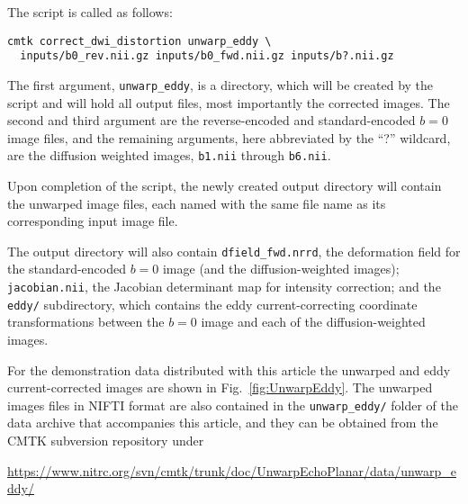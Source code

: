 \documentclass{InsightArticle}
\begin{document}
The script is called as follows:
\begin{verbatim}
cmtk correct_dwi_distortion unwarp_eddy \
  inputs/b0_rev.nii.gz inputs/b0_fwd.nii.gz inputs/b?.nii.gz
\end{verbatim}
The first argument, \verb|unwarp_eddy|, is a directory, which will be created
by the script and will hold all output files, most importantly the corrected
images. The second and third argument are the reverse-encoded and
standard-encoded $b=0$ image files, and the remaining arguments, here
abbreviated by the ``?'' wildcard, are the diffusion weighted images,
\verb|b1.nii| through \verb|b6.nii|.

Upon completion of the script, the newly created output directory will contain
the unwarped image files, each named with the same file name as its
corresponding input image file.

The output directory will also contain \verb|dfield_fwd.nrrd|, the deformation
field for the standard-encoded $b=0$ image (and the diffusion-weighted
images); \verb|jacobian.nii|, the Jacobian determinant map for intensity
correction; and the \verb|eddy/| subdirectory, which contains the eddy
current-correcting coordinate transformations between the $b=0$ image and each
of the diffusion-weighted images.

For the demonstration data distributed with this article the unwarped and eddy
current-corrected images are shown in Fig.~\ref{fig:UnwarpEddy}. The unwarped
images files in NIFTI format are also contained in the \verb|unwarp_eddy/| folder
of the data archive that accompanies this article, and they can be obtained
from the CMTK subversion repository under

\centerline{\url{https://www.nitrc.org/svn/cmtk/trunk/doc/UnwarpEchoPlanar/data/unwarp_eddy/}}
\end{document}
